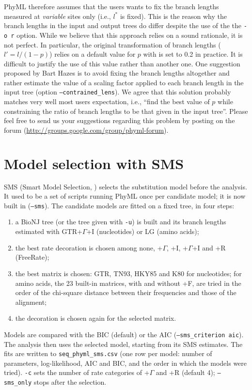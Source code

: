 \documentclass[a4paper,12pt]{article}
\newcommand{\x}[1]{\texttt{#1}}
\begin{document}
PhyML therefore  assumes that the  users wants  to fix the  branch lengths measured  at {\em variable}
sites only  (i.e., $l^{*}$ is  fixed). This is the  reason why the  branch lengths in the  input and
output trees  do differ  despite the  use of the  the \x{-o  r} option. While  we believe  that this
approach relies on a sound rationale, it  is not perfect. In particular, the original transformation
of  branch lengths  ($l' =  l/(1-p)$) relies  on a  default  value for  $p$ with  is set  to 0.2  in
practice. It is difficult  to justify the use of this value rather  than another one. One suggestion
proposed by  Bart Hazes is  to avoid fixing  the branch lengths  altogether and rather  estimate the
value  of   a  scaling  factor   applied  to   each  branch  length   in  the  input   tree  (option
\x{--contrained\_lens}).  We  agree  that  this  solution  probably matches  very  well  most  users
expectation, i.e., ``find the  best value of $p$ while constraining the ratio  of branch lengths to be
that given in the input tree''. Please feel free to send us your suggestions regarding this problem
by posting on the forum (\url{http://groups.google.com/group/phyml-forum}).


\section{Model selection with SMS}\label{sec:sms}

SMS (Smart Model Selection, \cite{lefort17}) selects the substitution model before the analysis.
It used to be a set of scripts running PhyML once per candidate model; it is now built in
(\x{--sms}). The candidate models are fitted on a fixed tree, in four steps:
\begin{enumerate}
\item a BioNJ tree (or the tree given with \x{-u}) is built and its branch lengths estimated with
  GTR+$\Gamma$+I (nucleotides) or LG (amino acids);
\item the best rate decoration is chosen among none, +$\Gamma$, +I, +$\Gamma$+I and +R (FreeRate);
\item the best matrix is chosen: GTR, TN93, HKY85 and K80 for nucleotides; for amino acids, the 23
  built-in matrices, with and without +F, are tried in the order of the chi-square distance between
  their frequencies and those of the alignment;
\item the decoration is chosen again for the selected matrix.
\end{enumerate}
Models are compared with the BIC (default) or the AIC (\x{--sms\_criterion aic}). The analysis then
uses the selected model, starting from its SMS estimates. The fits are written to
\x{seq\_phyml\_sms.csv} (one row per model: number of parameters, log-likelihood, AIC and BIC, and
the order in which the models were tried). \x{-c} sets the number of rate categories of +$\Gamma$
and +R (default 4); \x{--sms\_only} stops after the selection.
\end{document}
